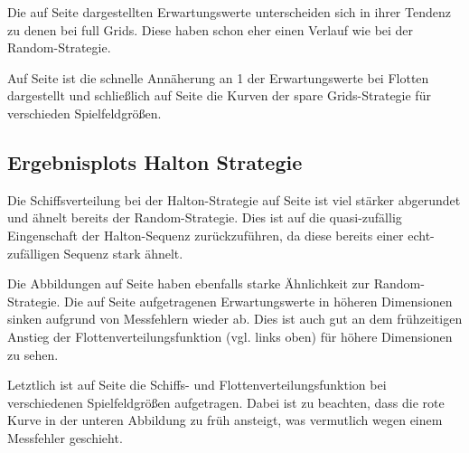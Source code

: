 \documentclass[a4paper,12pt]{llncs}
\numberwithin{equation}{section}
\begin{document}
Die auf Seite \pageref{fig:sparseGrid2} dargestellten Erwartungswerte unterscheiden sich in ihrer Tendenz zu denen bei full Grids. Diese haben schon eher einen Verlauf wie bei der Random-Strategie.

Auf Seite \pageref{fig:sparseGrid3} ist die schnelle Annäherung an 1 der Erwartungswerte bei Flotten dargestellt und schließlich auf Seite \pageref{fig:sparseGrid4} die Kurven der spare Grids-Strategie für verschieden Spielfeldgrößen.


\subsection{Ergebnisplots Halton Strategie}

\begin{landscape}
	\label{fig:halton1}
	
\end{landscape}

\begin{landscape}
	\label{fig:halton2}
	
\end{landscape}

\begin{landscape}
	\label{fig:halton3}
	
\end{landscape}

\begin{landscape}
	\label{fig:halton4}
	
\end{landscape}

Die Schiffsverteilung bei der Halton-Strategie auf Seite \pageref{fig:halton1} ist viel stärker abgerundet und ähnelt bereits der Random-Strategie. Dies ist auf die quasi-zufällig Eingenschaft der Halton-Sequenz zurückzuführen, da diese bereits einer echt-zufälligen Sequenz stark ähnelt. 

Die Abbildungen auf Seite \pageref{fig:halton2} haben ebenfalls starke Ähnlichkeit zur Random-Strategie. Die auf Seite \pageref{fig:halton3} aufgetragenen Erwartungswerte in höheren Dimensionen sinken aufgrund von Messfehlern wieder ab. Dies ist auch gut an dem frühzeitigen Anstieg der Flottenverteilungsfunktion (vgl. links oben) für höhere Dimensionen zu sehen.

Letztlich ist auf Seite \pageref{fig:halton4} die Schiffs- und Flottenverteilungsfunktion bei verschiedenen Spielfeldgrößen aufgetragen. Dabei ist zu beachten, dass die rote Kurve in der unteren Abbildung zu früh ansteigt, was vermutlich wegen einem Messfehler geschieht.
\end{document}
